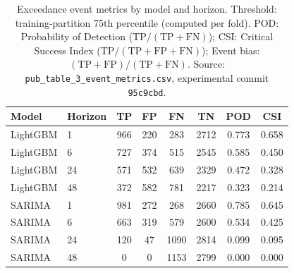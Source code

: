 \documentclass[12pt]{article}
\begin{document}
\clearpage
\begin{table}[p]
\centering
\caption{Exceedance event metrics by model and horizon.
Threshold: training-partition 75th percentile (computed per fold).
POD: Probability of Detection ($\mathrm{TP}/(\mathrm{TP}+\mathrm{FN})$);
CSI: Critical Success Index ($\mathrm{TP}/(\mathrm{TP}+\mathrm{FP}+\mathrm{FN})$);
Event bias: $(\mathrm{TP}+\mathrm{FP})/(\mathrm{TP}+\mathrm{FN})$.
Source: \texttt{pub\_table\_3\_event\_metrics.csv}, experimental commit
\texttt{95c9cbd}.}
\label{tab:event_metrics}
\begin{tabular}{llSSSSSS}
\toprule
Model & Horizon & TP & FP & FN & TN & {POD} & {CSI} \\
\midrule
LightGBM & 1  &  966 &  220 &  283 & 2712 & 0.773 & 0.658 \\
LightGBM & 6  &  727 &  374 &  515 & 2545 & 0.585 & 0.450 \\
LightGBM & 24 &  571 &  532 &  639 & 2329 & 0.472 & 0.328 \\
LightGBM & 48 &  372 &  582 &  781 & 2217 & 0.323 & 0.214 \\
\addlinespace
SARIMA   & 1  &  981 &  272 &  268 & 2660 & 0.785 & 0.645 \\
SARIMA   & 6  &  663 &  319 &  579 & 2600 & 0.534 & 0.425 \\
SARIMA   & 24 &  120 &   47 & 1090 & 2814 & 0.099 & 0.095 \\
SARIMA   & 48 &    0 &    0 & 1153 & 2799 & 0.000 & 0.000 \\
\bottomrule
\end{tabular}
\end{table}
\end{document}
